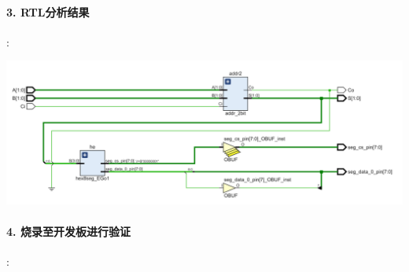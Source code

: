 \documentclass[a4,10pt,zihao=-4]{ctexart}
\begin{document}
\paragraph{3. RTL分析结果}:

\includegraphics[width=1\textwidth]{ego1_RTL.png}

\paragraph{4. 烧录至开发板进行验证}:
\end{document}
